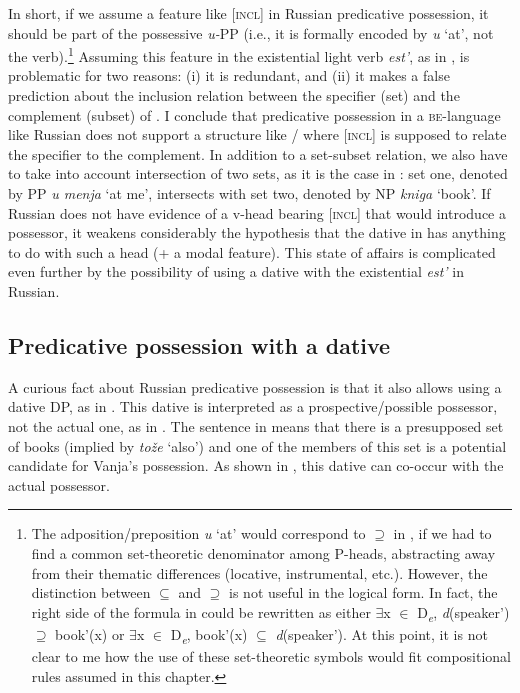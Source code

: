 \documentclass[output=paper,colorlinks,citecolor=brown,nonflat]{./langscibook}
\begin{document}
In short, if we assume a feature like [\textsc{incl}] in Russian predicative possession, it should be part of the possessive \textit{u-}PP (i.e., it is formally encoded by \textit{u} ‘at’, not the verb).\footnote{The adposition/preposition \textit{u} ‘at’ would correspond to \textrm{${\supseteq}$} in , if we had to find a common set-theoretic denominator among P-heads, abstracting away from their thematic differences (locative, instrumental, etc.). However, the distinction between \textrm{${\subseteq}$} and \textrm{${\supseteq}$} is not useful in the logical form. In fact, the right side of the formula in  could be rewritten as either \textrm{${\exists}$}x \textrm{${\in}$} D\textit{\textsubscript{e}}, \textit{d}(speaker\textrm{'}) \textrm{${\supseteq}$} book\textrm{'}(x) or \textrm{${\exists}$}x \textrm{${\in}$} D\textit{\textsubscript{e}}, book\textrm{'}(x) \textrm{${\subseteq}$} \textit{d}(speaker\textrm{'}). At this point, it is not clear to me how the use of these set-theoretic symbols would fit compositional rules assumed in this chapter.}  Assuming this feature in the existential light verb \textit{est’}, as in , is problematic for two reasons: (i) it is redundant, and (ii) it makes a false prediction about the inclusion relation between the specifier (set) and the complement (subset) of \liv . I conclude that predicative possession in a \textsc{be}{}-language like Russian does not support a structure like / where [\textsc{incl}] is supposed to relate the specifier to the complement. In addition to a set-subset relation, we also have to take into account intersection of two sets, as it is the case in : set one, denoted by PP \textit{u menja} ‘at me’, intersects with set two, denoted by NP \textit{kniga} ‘book’. If Russian does not have evidence of a v-head bearing [\textsc{incl}] that would introduce a possessor, it weakens considerably the hypothesis that the dative in  has anything to do with such a head (+ a modal feature). This state of affairs is complicated even further by the possibility of using a dative with the existential \textit{est’} in Russian.

\subsection{Predicative possession with a dative}\label{sec:tsedryk:2.3}

A curious fact about Russian predicative possession is that it also allows using a dative DP, as in . This dative is interpreted as a prospective/possible possessor, not the actual one, as in . The sentence in  means that there is a presupposed set of books (implied by \textit{tože} ‘also’) and one of the members of this set is a potential candidate for Vanja’s possession. As shown in , this dative can co-occur with the actual possessor. 
\end{document}
